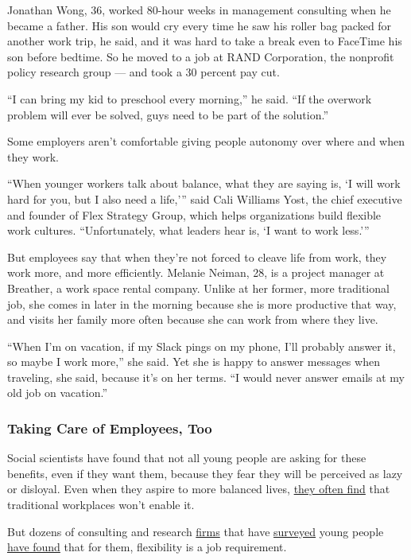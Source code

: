 Jonathan Wong, 36, worked 80-hour weeks in management consulting when he
became a father. His son would cry every time he saw his roller bag
packed for another work trip, he said, and it was hard to take a break
even to FaceTime his son before bedtime. So he moved to a job at RAND
Corporation, the nonprofit policy research group --- and took a 30
percent pay cut.

``I can bring my kid to preschool every morning,'' he said. ``If the
overwork problem will ever be solved, guys need to be part of the
solution.''

Some employers aren't comfortable giving people autonomy over where and
when they work.

``When younger workers talk about balance, what they are saying is, `I
will work hard for you, but I also need a life,''' said Cali Williams
Yost, the chief executive and founder of Flex Strategy Group, which
helps organizations build flexible work cultures. ``Unfortunately, what
leaders hear is, `I want to work less.'''

But employees say that when they're not forced to cleave life from work,
they work more, and more efficiently. Melanie Neiman, 28, is a project
manager at Breather, a work space rental company. Unlike at her former,
more traditional job, she comes in later in the morning because she is
more productive that way, and visits her family more often because she
can work from where they live.

``When I'm on vacation, if my Slack pings on my phone, I'll probably
answer it, so maybe I work more,'' she said. Yet she is happy to answer
messages when traveling, she said, because it's on her terms. ``I would
never answer emails at my old job on vacation.''

\hypertarget{taking-care-of-employees-too}{%
\subsubsection{Taking Care of Employees,
Too}\label{taking-care-of-employees-too}}

Social scientists have found that not all young people are asking for
these benefits, even if they want them, because they fear they will be
perceived as lazy or disloyal. Even when they aspire to more balanced
lives,
\href{https://www.nytimes3xbfgragh.onion/2015/07/31/upshot/millennial-men-find-work-and-family-hard-to-balance.html}{they
often find} that traditional workplaces won't enable it.

But dozens of consulting and research
\href{https://www.accenture.com/us-en/insight-gen-z-rising}{firms} that
have
\href{https://www2.deloitte.com/global/en/pages/about-deloitte/articles/millennialsurvey.html}{surveyed}
young people
\href{https://workforceinstitute.org/wp-content/uploads/2019/05/Meet-Gen-Z-Hopeful-Anxious-Hardworking-and-Searching-for-Inspiration.pdf}{have
found} that for them, flexibility is a job requirement.

